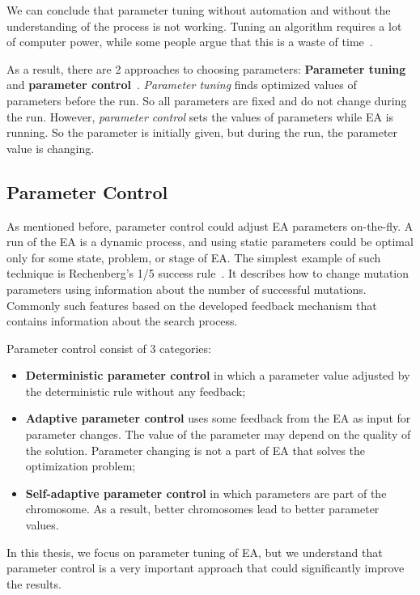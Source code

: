 We can conclude that parameter tuning without automation and without the understanding of the process is not working. Tuning an algorithm requires a lot of computer power,
while some people argue that this is a waste of time~\cite{smit2009comparing}.

As a result, there are 2 approaches to choosing parameters: \textbf{Parameter tuning} and \textbf{parameter control}~\cite{smit2012parameter,eiben03}.
\textit{Parameter tuning} finds optimized values of parameters before the run. So all parameters are fixed and do not change during the run. However, \textit{parameter control} sets the values of parameters while EA is running. So the parameter is initially given, but during the run, the parameter value is changing. 

\subsection{Parameter Control}
As mentioned before, parameter control could adjust EA parameters on-the-fly. A run of the EA is a dynamic process, and using static parameters could be optimal only for some state, problem, or stage of EA. 
The simplest example of such technique is Rechenberg's 1/5 success rule~\cite{rechenberg1973evolutionsstrategie}. It describes how to change mutation parameters using information about the number of successful mutations. Commonly such features based on the developed feedback mechanism that contains information about the search process.

Parameter control consist of 3 categories:
\begin{itemize}
	\item \textbf{Deterministic parameter control} in which a parameter value adjusted by the deterministic rule without any feedback;
	\item \textbf{Adaptive parameter control}  uses some feedback from the EA as input for parameter changes. The value of the parameter may depend on the quality of the solution. Parameter changing is not a part of EA that solves the optimization problem;
	\item \textbf{Self-adaptive parameter control} in which parameters are part of the chromosome. As a result, better chromosomes lead to better parameter values.
\end{itemize}
In this thesis, we focus on parameter tuning of EA, but we understand that parameter control is a very important approach that could significantly improve the results.

